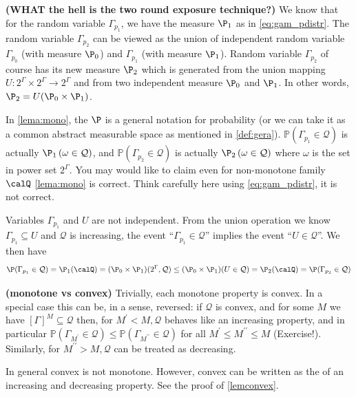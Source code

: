 \documentclass{article}
\newcommand{\bfs}[1]{\textbf{({#1}) }}
\begin{document}
\begin{rema}{\bfs{WHAT the hell is the two round exposure technique?}}\label{rem:twpexp} We know that for the random variable $\Gamma_{p_{1}}$,  we have the measure $\P_1$ as in \cref{eq:gam_pdistr}. The random variable  $\Gamma_{p_{2}}$ can be viewed as the union of independent random variable $\Gamma_{p_{0}}$ (with measure $\P_0$) and $\Gamma_{p_{1}}$ (with measure $\P_1$).  Random variable  $\Gamma_{p_{2}}$ of course has its new measure $\P_2$ which is generated from the union mapping $U: 2^{\Gamma}\times 2^{\Gamma}\to 2^{\Gamma}$ and from two independent measure $\P_0$ and  $\P_1$. In other words, $\P_2 = U(\P_0\times\P_1)$.


In \cref{lema:mono}, the $\P$ is a general notation for probability (or we can take it as a common abstract measurable space as mentioned in \cref{def:gera}). $\mathbb{P}\left(\Gamma_{p_{1}} \in \mathcal{Q}\right)$ is actually $\P_1\left(\omega \in \mathcal{Q}\right)$, and $\mathbb{P}\left(\Gamma_{p_{2}} \in \mathcal{Q}\right)$ is actually $\P_2\left(\omega \in \mathcal{Q}\right)$ where $\omega$ is the set in power set $2^{\Gamma}$. You may would like to claim even for non-monotone family $\calQ$ \cref{lema:mono} is correct. Think carefully here using \cref{eq:gam_pdistr}, it is not correct.


Variables $\Gamma_{p_{1}}$ and $U$ are not independent. From the union operation we know $\Gamma_{p_{1}} \subseteq U$ and $\mathcal{Q}$ is increasing, the event ``$\Gamma_{p_{1}} \in \mathcal{Q}$'' implies the event ``$U \in \mathcal{Q}$''. We then have
$$\P(\Gamma_{p_{1}} \in \mathcal{Q})=\P_1(\calQ)=(\P_0\times\P_1)( 2^{\Gamma}, \mathcal{Q})\le (\P_0\times\P_1)(U \in \mathcal{Q}) =\P_2(\calQ) = \P(\Gamma_{p_{2}} \in \mathcal{Q})$$
\end{rema}
\begin{rema}{\bfs{monotone vs convex}}
Trivially, each monotone property is convex. In a special case this can be, in a sense, reversed: if $\mathcal{Q}$ is convex, and for some $M$ we have $[\Gamma]^{M} \subseteq \mathcal{Q}$ then, for $M^{\prime}<M, \mathcal{Q}$ behaves like an increasing property, and in particular $\mathbb{P}\left(\Gamma_{M^{\prime}} \in \mathcal{Q}\right) \leq \mathbb{P}\left(\Gamma_{M^{\prime \prime}} \in \mathcal{Q}\right)$ for all $M^{\prime} \leq M^{\prime \prime} \leq M$ (Exercise!). Similarly,
for $M^{\prime \prime}>M, \mathcal{Q}$ can be treated as decreasing. 

In general convex is not monotone. However, convex can be written as the  of an increasing and decreasing property. See the proof of \cref{lemconvex}.
\end{rema}
\end{document}
